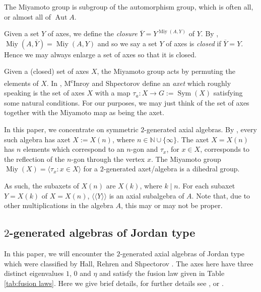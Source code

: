 \documentclass[11pt, a4paper]{article}
\theoremstyle{plain}
\theoremstyle{definition}
\newtheorem{definition}[theorem]{Definition}
\newcommand\cF{\mathcal{F}}
\newcommand\la{\langle}
\newcommand\ra{\rangle}
\newcommand\lla{\langle\!\langle}
\newcommand\rra{\rangle\!\rangle}
\DeclareMathOperator{\Aut}{Aut}
\DeclareMathOperator{\Sym}{Sym}
\newcommand\N{\mathbb{N}}
\DeclareMathOperator{\Miy}{Miy}
\newcommand{\0}{\overline{0}}
\newcommand{\2}{\overline{2}}
\newcommand{\1}{\mathbbm{1}}
\begin{document}

The Miyamoto group is subgroup of the automorphism group, which is often all, or almost all of $\Aut A$.

Given a set $Y$ of axes, we define the \emph{closure} $\overline{Y} = Y^{\Miy(A, Y)}$ of $Y$.  By \cite{axialstructure}, $\Miy(A, \overline{Y}) = \Miy(A, Y)$ and  so we say a set $Y$ of axes is \emph{closed} if $\overline{Y} = Y$.  Hence we may always enlarge a set of axes so that it is closed.

Given a (closed) set of axes $X$, the Miyamoto group acts by permuting the elements of $X$.  In \cite{forbidden}, M\textsuperscript{c}Inroy and Shpectorov define an \emph{axet} which roughly speaking is the set of axes $X$ with a map $\tau_a \colon X \to G := \Sym(X)$ satisfying some natural conditions.  For our purposes, we may just think of the set of axes together with the Miyamoto map as being the axet.

In this paper, we concentrate on symmetric $2$-generated axial algebras.  By \cite[Theorem 1.1]{forbidden}, every such algebra has axet $X := X(n)$, where $n  \in \N \cup \{ \infty\}$.  The axet $X = X(n)$ has $n$ elements which correspond to an $n$-gon and $\tau_x$, for $x \in X$, corresponds to the reflection of the $n$-gon through the vertex $x$.  The Miyamoto group $\Miy(X) = \la \tau_x : x \in X \ra$ for a $2$-generated axet/algebra is a dihedral group.

As such, the subaxets of $X(n)$ are $X(k)$, where $k \mid n$.  For each subaxet $Y = X(k)$ of $X = X(n)$, $\lla  Y \rra$ is an axial subalgebra of $A$.  Note that, due to other multiplications in the algebra $A$, this may or may not be proper.


\subsection{$2$-generated algebras of Jordan type}

In this paper, we will encounter the $2$-generated axial algebras of Jordan type which were classified by Hall, Rehren and Shpectorov \cite{Axial1}.  The axes here have three distinct eigenvalues $1$, $0$ and $\eta$ and satisfy the fusion law given in Table \ref{tab:fusion laws}. Here we give brief details, for further details see \cite{Axial1}, or \cite[Section 5]{forbidden}. 
\end{document}
